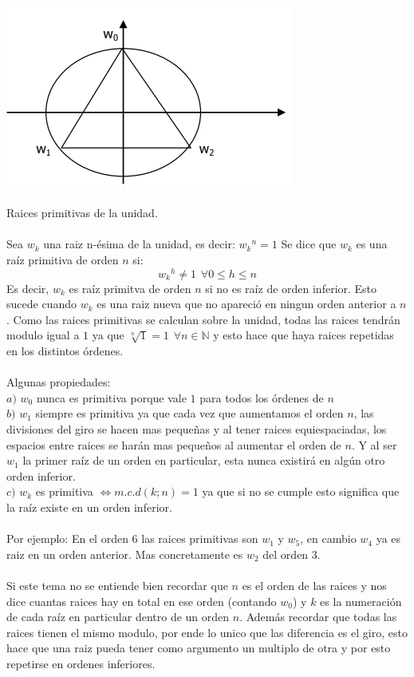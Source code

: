 \documentclass[]{article}
\begin{document}
\includegraphics{../../../Imagenes/Superior/Complejos/Complejos04.PNG}
\\
\\
\Large Raices primitivas de la unidad.
\normalsize
\\
\\
Sea $w_k$ una raiz n-ésima de la unidad, es decir: ${w_k}^{n} = 1$ Se dice que $w_k$ es una raíz primitiva de orden $n$ si:
$$
{w_k}^{h} \neq 1\hspace{5pt}\forall 0 \leq h \leq n
$$
Es decir, $w_k$ es raíz primitva de orden $n$ si no es raíz de orden inferior. Esto sucede cuando $w_k$ es una raiz nueva que no apareció en ningun orden anterior a $n$.
Como las raices primitivas se calculan sobre la unidad, todas las raices tendrán modulo igual a $1$ ya que $\sqrt[n]{1} = 1 \hspace{5pt} \forall n \in \mathbb{N}$ y esto hace que haya raices repetidas en los distintos órdenes.
\\
\\
Algunas propiedades:
\\
$a)$  $w_0$ nunca es primitiva porque vale $1$ para todos los órdenes de $n$\\
$b)$  $w_1$ siempre es primitiva ya que cada vez que aumentamos el orden $n$, las divisiones del giro se hacen mas pequeñas y al tener raices equiespaciadas, los espacios entre raices se harán mas pequeños al aumentar el orden de $n$. Y al ser $w_1$ la primer raíz de un orden en particular, esta nunca existirá en algún otro orden inferior.\\
$c)$  $w_k$ es primitiva $\Leftrightarrow m.c.d(k;n) = 1$ ya que si no se cumple esto significa que la raíz existe en un orden inferior.
\\
\\
Por ejemplo: En el orden $6$ las raices primitivas son $w_1$ y $w_5$, en cambio $w_4$ ya es raiz en un orden anterior. Mas concretamente es $w_2$ del orden $3$.
\\
\\
Si este tema no se entiende bien recordar que $n$ es el orden de las raices y nos dice cuantas raices hay en total en ese orden (contando $w_0$) y $k$ es la numeración de cada raíz en particular dentro de un orden $n$. Además recordar que todas las raices tienen el mismo modulo, por ende lo unico que las diferencia es el giro, esto hace que una raiz pueda tener como argumento un multiplo de otra y por esto repetirse en ordenes inferiores.
\end{document}
